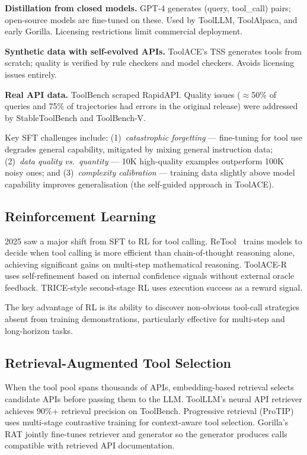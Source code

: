 \documentclass[11pt]{article}
\begin{document}
\textbf{Distillation from closed models.} GPT-4 generates (query, tool\_call) pairs; open-source
models are fine-tuned on these. Used by ToolLLM, ToolAlpaca, and early Gorilla. Licensing
restrictions limit commercial deployment.

\textbf{Synthetic data with self-evolved APIs.} ToolACE's TSS generates tools from scratch; quality
is verified by rule checkers and model checkers. Avoids licensing issues entirely.

\textbf{Real API data.} ToolBench scraped RapidAPI. Quality issues ($\approx$50\% of queries and
75\% of trajectories had errors in the original release) were addressed by StableToolBench and
ToolBench-V.

Key SFT challenges include: (1)~\emph{catastrophic forgetting} --- fine-tuning for tool use
degrades general capability, mitigated by mixing general instruction data; (2)~\emph{data quality
vs.\ quantity} --- 10K high-quality examples outperform 100K noisy ones; and
(3)~\emph{complexity calibration} --- training data slightly above model capability improves
generalisation (the self-guided approach in ToolACE).

\subsection{Reinforcement Learning}

2025 saw a major shift from SFT to RL for tool calling.
ReTool~\citep{feng2025retool} trains models to decide when tool calling is more efficient than
chain-of-thought reasoning alone, achieving significant gains on multi-step mathematical reasoning.
ToolACE-R uses self-refinement based on internal confidence signals without external oracle feedback.
TRICE-style second-stage RL uses execution success as a reward signal.

The key advantage of RL is its ability to discover non-obvious tool-call strategies absent from
training demonstrations, particularly effective for multi-step and long-horizon tasks.

\subsection{Retrieval-Augmented Tool Selection}

When the tool pool spans thousands of APIs, embedding-based retrieval selects candidate APIs before
passing them to the LLM. ToolLLM's neural API retriever achieves 90\%+ retrieval precision on
ToolBench. Progressive retrieval (ProTIP) uses multi-stage contrastive training for context-aware
tool selection. Gorilla's RAT jointly fine-tunes retriever and generator so the generator produces
calls compatible with retrieved API documentation.
\end{document}
